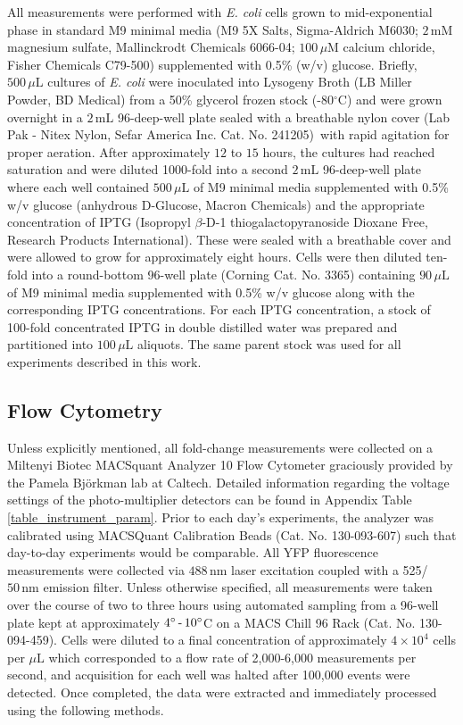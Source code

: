 All measurements were performed with \textit{E. coli} cells grown to
mid-exponential phase in standard M9 minimal media (M9 5X Salts, Sigma-Aldrich
M6030; $2\,\text{mM}$ magnesium sulfate, Mallinckrodt Chemicals 6066-04; $100\,\mu\text{M}$
calcium chloride, Fisher Chemicals C79-500) supplemented with 0.5\% (w/v)
glucose. Briefly, $500\,\mu\text{L}$ cultures of \textit{E. coli} were inoculated into
Lysogeny Broth (LB Miller Powder, BD Medical) from a 50\% glycerol frozen stock
(-80$^\circ$C) and were grown overnight in a $2\,\text{mL}$ 96-deep-well plate sealed with
a breathable nylon cover (Lab Pak - Nitex Nylon, Sefar America Inc. Cat. No.
241205)~with rapid agitation for proper aeration. After approximately $12$ to
$15$ hours, the cultures had reached saturation and were diluted 1000-fold into
a second $2\,\text{mL}$ 96-deep-well plate where each well contained $500\,\mu\text{L}$ of M9
minimal media supplemented with 0.5\% w/v glucose (anhydrous D-Glucose, Macron
Chemicals) and the appropriate concentration of IPTG (Isopropyl $\beta$-D-1
thiogalactopyranoside Dioxane Free, Research Products International). These were
sealed with a breathable cover and were allowed to grow for approximately eight
hours. Cells were then diluted ten-fold into a round-bottom 96-well plate
(Corning Cat. No. 3365) containing $90\,\mu\text{L}$ of M9 minimal media
supplemented with 0.5\% w/v glucose along with the corresponding IPTG
concentrations. For each IPTG concentration, a stock of 100-fold concentrated
IPTG in double distilled water was prepared and partitioned into
$100\,\mu\text{L}$ aliquots. The same parent stock was used for all experiments
described in this work.

\subsection*{Flow Cytometry}

Unless explicitly mentioned, all fold-change measurements were collected on a
Miltenyi Biotec MACSquant Analyzer 10 Flow Cytometer graciously provided by the
Pamela Bj\"{o}rkman lab at Caltech. Detailed information regarding the voltage
settings of the photo-multiplier detectors can be found in Appendix Table
\ref{table_instrument_param}. Prior to each day's experiments, the analyzer was
calibrated using MACSQuant Calibration Beads (Cat. No. 130-093-607) such that
day-to-day experiments would be comparable. All YFP fluorescence measurements
were collected via $488\,\text{nm}$ laser excitation coupled with a
525/$50\,\text{nm}$ emission filter. Unless otherwise specified, all
measurements were taken over the course of two to three hours using automated
sampling from a 96-well plate kept at approximately $4^\circ \, \hbox{-} \,
10^\circ$C on a MACS Chill 96 Rack (Cat. No. 130-094-459). Cells were diluted to
a final concentration of approximately $4\times 10^{4}$ cells per $\mu\text{L}$
which corresponded to a flow rate of 2,000-6,000 measurements per second, and
acquisition for each well was halted after 100,000 events were detected. Once
completed, the data were extracted and immediately processed using the following
methods.


